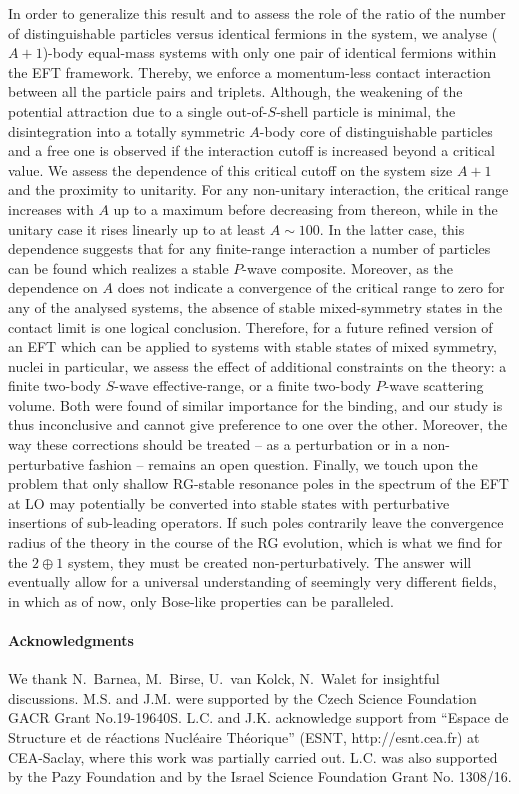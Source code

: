 \documentclass[onecolumn,preprint,superscriptaddress,nofootinbib]{revtex4-1}
\begin{document}
In order to generalize this result and to assess the role of the ratio of the number of distinguishable particles versus identical
fermions in the system, we analyse ($A+1$)-body equal-mass systems with only one pair of identical fermions within the EFT framework.
Thereby, we enforce a momentum-less contact interaction between all the particle pairs and triplets.
Although, the weakening of the potential attraction due to a single out-of-$S$-shell particle is minimal,
the disintegration into a totally symmetric $A$-body core of distinguishable particles
and a free one is observed if the interaction cutoff is increased beyond a critical value.
We assess the dependence of this critical cutoff on the system size $A+1$ and the proximity to unitarity.
For any non-unitary interaction, the critical range increases with $A$ up to a maximum before decreasing from thereon, while in the unitary
case it rises linearly up to at least $A\sim100$.
In the latter case, this dependence suggests that for any finite-range interaction a number of particles can be found which realizes a stable $P$-wave composite.
Moreover, as the dependence on $A$ does not indicate a convergence of the critical range to zero
for any of the analysed systems, the absence of stable mixed-symmetry states in the contact limit
is one logical conclusion.
Therefore, for a future refined version of an EFT which can be applied to systems with stable states of mixed symmetry,
nuclei in particular, we assess the effect of additional constraints on the theory:
a finite two-body $S$-wave effective-range, or a finite two-body $P$-wave scattering volume. 
Both were found of similar importance for the binding, and our study is thus inconclusive and cannot give preference to one over the other.
Moreover, the way these corrections should be treated -- as a perturbation or in
a non-perturbative fashion -- remains an open question.
Finally, we touch upon the problem that only shallow RG-stable resonance poles in the
spectrum of the EFT at LO may potentially be converted into stable states with perturbative
insertions of sub-leading operators.
If such poles contrarily leave the convergence radius of the theory in the course of the RG evolution, which is what we find for the $2\oplus1$ system, they must be created non-perturbatively.
The answer will eventually allow for a universal understanding of seemingly very different fields,
in which as of now, only Bose-like properties can be paralleled.

\vspace{5mm}
\paragraph*{Acknowledgments}
We thank N.~Barnea,  M.~Birse, U.~van Kolck, N.~Walet for insightful
discussions.
M.S. and J.M. were supported by the Czech Science Foundation GACR Grant No.19-19640S.
L.C. and J.K. acknowledge support from ``Espace de Structure et de r\'eactions
Nucl\'eaire Th\'eorique'' (ESNT, http://esnt.cea.fr) at CEA-Saclay, where this work
was partially carried out.
L.C. was also supported by the Pazy Foundation and by the
Israel Science Foundation Grant No. 1308/16.


\newpage



\end{document}
